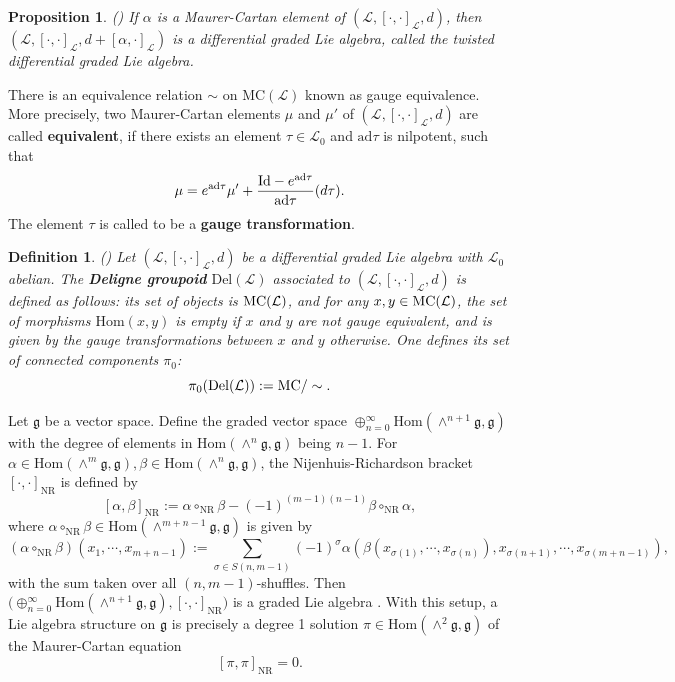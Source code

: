 \documentclass[12pt]{amsart}
\newtheorem{pro}[thm]{Proposition}
\newtheorem{defi}[thm]{Definition}
\newcommand{\g}{\mathfrak g}
\newcommand{\huaL}{\mathcal{L}}
\newcommand{\Id}{{\rm{Id}}}
\newcommand{\Hom}{\mathrm{Hom}}
\newcommand{\NR}{\mathrm{NR}}
\newcommand{\ad}{\mathrm{ad}}
\begin{document}
\begin{pro}\label{twistdg}{\rm (\cite{DSV, Get})}
If $\alpha$ is a Maurer-Cartan element of $(\huaL,[\cdot,\cdot]_{\huaL},d)$, then $(\huaL,[\cdot,\cdot]_{\huaL}, d+[\alpha, \cdot]_{\huaL})$ is a differential graded Lie algebra, called the twisted differential graded Lie algebra.
\end{pro}
There is an equivalence relation $\sim$ on $\mathrm{MC}(\huaL)$ known as gauge equivalence. More precisely, two {\rm Maurer-Cartan} elements  $\mu$ and $\mu'$ of $(\huaL,[\cdot,\cdot]_{\huaL},d)$ are called {\bf equivalent}, if there exists an element $\tau\in \huaL_{0}$ and $\ad\tau$ is nilpotent, such that 
    \begin{equation*}
        \mu=e^{\ad\tau}\mu'+\frac{\Id-e^{\ad\tau}}{\ad\tau}(d\tau).
    \end{equation*}
The element $\tau$ is called to be a {\bf gauge transformation}.

   

\begin{defi}{\rm(\cite{Fr})}
    Let $(\huaL,[\cdot,\cdot]_{\huaL},d)$ be a differential graded Lie algebra with $\huaL_0$ abelian. The {\bf Deligne groupoid} $\mathrm{Del}(\huaL)$ associated to $(\huaL,[\cdot,\cdot]_{\huaL},d)$ is defined as follows: its set of objects is ${\rm MC}(\huaL)$, and for any $x, y\in {\rm MC}(\huaL)$, the set of morphisms $\Hom(x, y)$ is empty if $x$ and $y$ are not gauge equivalent, and is given by the gauge transformations between $x$ and $y$ otherwise. One defines its set of connected components $\pi_0$:
    $$
    \pi_0(\mathrm{Del}(\huaL)):={\rm MC}/\sim.
    $$
\end{defi}
Let $\g$ be a vector space. Define the graded vector space
$\oplus_{n=0}^\infty \Hom(\wedge^{n+1}\g,\g)$
with the degree of elements in $\Hom(\wedge^n\g,\g)$ being $n-1$. For $\alpha\in \Hom(\wedge^m\g,\g), \beta\in \Hom(\wedge^n\g,\g)$, the  Nijenhuis-Richardson bracket $[\cdot,\cdot]_\NR$ is defined by
$$ [\alpha,\beta]_{\NR}:=\alpha\circ_\NR\beta- (-1)^{(m-1)(n-1)}\beta\circ_{\NR}\alpha,$$
where $\alpha\circ_{\NR}\beta\in \Hom(\wedge^{m+n-1}\g,\g)$ is given by
\begin{equation}
(\alpha\circ_\NR\beta)(x_1,\cdots,x_{m+n-1}):=\sum_{\sigma\in S(n,m-1)} (-1)^\sigma \alpha(\beta(x_{\sigma(1)},\cdots,x_{\sigma(n)}),x_{\sigma(n+1)}, \cdots,x_{\sigma(m+n-1)}),
\label{eq:fgcirc}
\end{equation}
with the sum taken over all $(n,m-1)$-shuffles.
Then $\big(\oplus_{n=0}^\infty \Hom(\wedge^{n+1}\g,\g),[\cdot,\cdot]_{\NR}\big)$ is a graded Lie algebra \cite{NR,NR2}. With this setup, a Lie algebra structure on $\g$ is precisely a degree 1 solution $\pi\in \Hom(\wedge^2\g,\g)$ of the {\rm Maurer-Cartan} equation
$$ [\pi,\pi ]_{\NR}=0.$$
\end{document}
